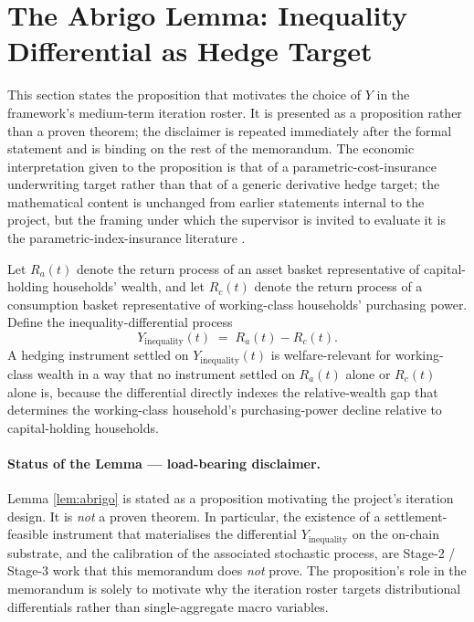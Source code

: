 \section{The Abrigo Lemma: Inequality Differential as Hedge Target}\label{sec:3}

This section states the proposition that motivates the choice of \(Y\) in
the framework's medium-term iteration roster. It is presented as a
proposition rather than a proven theorem; the disclaimer is repeated
immediately after the formal statement and is binding on the rest of the
memorandum. The economic interpretation given to the proposition is that
of a parametric-cost-insurance underwriting target rather than that of a
generic derivative hedge target; the mathematical content is unchanged
from earlier statements internal to the project, but the framing under
which the supervisor is invited to evaluate it is the
parametric-index-insurance literature
\citep{carter_etal_2017,mahul_stutley_2010,clarke_2016}.

\begin{lemma}\label{lem:abrigo}
Let \(R_a(t)\) denote the return process of an asset basket representative
of capital-holding households' wealth, and let \(R_c(t)\) denote the
return process of a consumption basket representative of working-class
households' purchasing power. Define the inequality-differential process
\[
  Y_{\text{inequality}}(t) \;=\; R_a(t) - R_c(t).
\]
A hedging instrument settled on \(Y_{\text{inequality}}(t)\) is
welfare-relevant for working-class wealth in a way that no instrument
settled on \(R_a(t)\) alone or \(R_c(t)\) alone is, because the
differential directly indexes the relative-wealth gap that determines the
working-class household's purchasing-power decline relative to
capital-holding households.
\end{lemma}

\paragraph{Status of the Lemma --- load-bearing disclaimer.} Lemma
\ref{lem:abrigo} is stated as a proposition motivating the project's
iteration design. It is \emph{not} a proven theorem. In particular, the
existence of a settlement-feasible instrument that materialises the
differential \(Y_{\text{inequality}}\) on the on-chain substrate, and the
calibration of the associated stochastic process, are Stage-2 / Stage-3
work that this memorandum does \emph{not} prove. The proposition's role
in the memorandum is solely to motivate why the iteration roster targets
distributional differentials rather than single-aggregate macro
variables.

